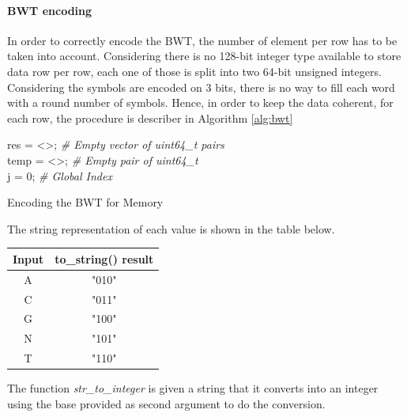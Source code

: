 \vspace*{8mm}

\paragraph{BWT encoding}

In order to correctly encode the BWT, the number of element per row has to be taken into account. Considering there is no 128-bit integer type available to store data row per row, each one of those is split into two 64-bit unsigned integers. Considering the symbols are encoded on 3 bits, there is no way to fill each word with a round number of symbols. Hence, in order to keep the data coherent, for each row, the procedure is describer in Algorithm \ref{alg:bwt}
\vspace*{5mm}


\begin{minipage}[t]{0.55\textwidth}
\begin{algorithm}[H]
	\SetAlgoLined
	res = <>; \textit{\# Empty vector of uint64\_t pairs} \\
	temp = <>; \textit{\# Empty pair of uint64\_t} \\
	j = 0; \textit{\# Global Index}\\
\caption{Encoding the BWT for Memory
}
\label{alg:bwt}
\end{algorithm}
\end{minipage}
 \hfill
\begin{minipage}[t]{0.3 \textwidth}
The string representation of each value is shown in the table below.
\vspace*{5mm}


\begin{tabular}{|c|c|}
\hline
Input    &  to\_string() result\\
\hline
 A    &  "010" \\
 C    &  "011" \\
 G    &  "100" \\
 N    &  "101" \\
 T    &  "110" \\
\hline
\end{tabular}
\vspace*{3mm}

The function \textit{str\_to\_integer} is given a string that it converts into an integer using the base provided as second argument to do the conversion. \\
\end{minipage}
\vspace*{5mm}


